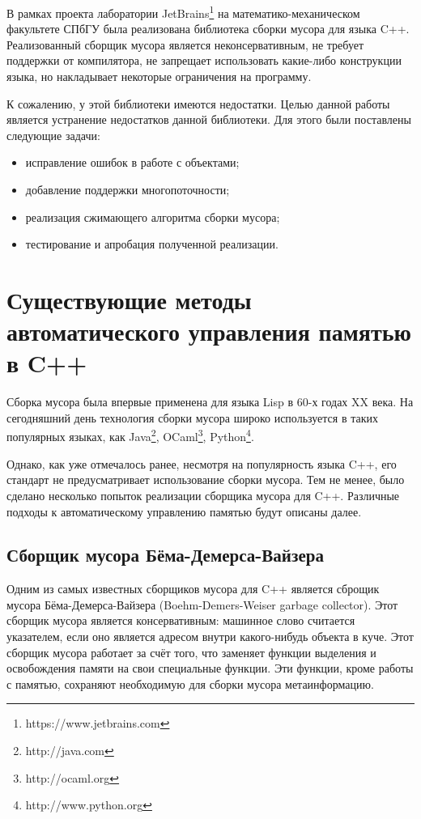 \documentclass[14pt]{matmex-diploma}
\begin{document}
В рамках проекта лаборатории JetBrains\footnote{https://www.jetbrains.com} на математико-механическом факультете СПбГУ
была реализована библиотека сборки мусора для языка C++\cite{berezun}. 
Реализованный сборщик мусора является неконсервативным, не требует поддержки от компилятора, не запрещает использовать какие-либо конструкции языка, но накладывает некоторые ограничения на программу.

К сожалению, у этой библиотеки имеются недостатки. Целью данной работы является устранение недостатков данной библиотеки. Для этого были поставлены следующие задачи: 
\begin{itemize}
\item исправление ошибок в работе с объектами; 
\item добавление поддержки многопоточности;
\item реализация сжимающего алгоритма сборки мусора;
\item тестирование и апробация полученной реализации.
\end{itemize}


\section{Существующие методы автоматического управления памятью в C++}
Сборка мусора была впервые применена для языка Lisp\cite{lisp} в 60-х годах XX века. На сегодняшний день технология сборки мусора широко используется в таких популярных языках, как Java\footnote{http://java.com}, OCaml\footnote{http://ocaml.org}, Python\footnote{http://www.python.org}.

Однако, как уже отмечалось ранее, несмотря на популярность языка C++, его стандарт не предусматривает использование сборки мусора. Тем не менее, было сделано несколько попыток реализации сборщика мусора для C++. Различные подходы к автоматическому управлению памятью будут описаны далее.

\subsection{Сборщик мусора Бёма-Демерса-Вайзера}
Одним из самых известных сборщиков мусора для C++ является сброщик мусора Бёма-Демерса-Вайзера (Boehm-Demers-Weiser garbage collector)\cite{boehm1, boehm2, boehm3}. Этот сборщик мусора является консервативным: машинное слово считается указателем, если оно является адресом внутри какого-нибудь объекта в куче. Этот сборщик мусора работает за счёт того, что заменяет функции выделения и освобождения памяти на свои специальные функции. Эти функции, кроме работы с памятью, сохраняют необходимую для сборки мусора метаинформацию.
\end{document}
